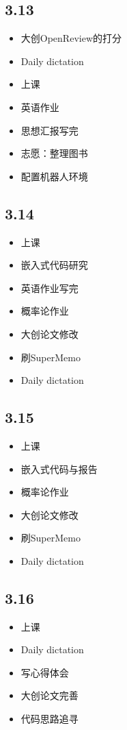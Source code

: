 \documentclass[UTF8]{ctexart}
\begin{document}
\subsection*{3.13}
\begin{itemize}
    \item 大创OpenReview的打分
    \item Daily dictation
    \item 上课
    \item 英语作业
    \item 思想汇报写完
    \item 志愿：整理图书
    \item 配置机器人环境
\end{itemize}
\subsection*{3.14}
\begin{itemize}
    \item 上课
    \item 嵌入式代码研究
    \item 英语作业写完
    \item 概率论作业
    \item 大创论文修改
    \item 刷SuperMemo
    \item Daily dictation
\end{itemize}
\subsection*{3.15}
\begin{itemize}
    \item 上课
    \item 嵌入式代码与报告
    \item 概率论作业
    \item 大创论文修改
    \item 刷SuperMemo
    \item Daily dictation
\end{itemize}
\subsection*{3.16}
\begin{itemize}
    \item 上课
    \item Daily dictation
    \item 写心得体会
    \item 大创论文完善
    \item 代码思路追寻
\end{itemize}
\end{document}
